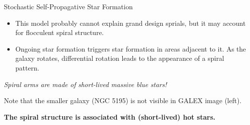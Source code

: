 \documentclass[letterpaper,landscape]{slides}
\begin{document}
\begin{slide}
\begin{center}
   {\large \color{red} Stochastic Self-Propagative Star Formation}
\end{center}

\begin{center}

\begin{itemize}
\vskip -0.3in
\item 
This model probably cannot explain grand design sprials, but it may account
for flocculent spiral structure. 
\vskip -0.3in
\item
Ongoing star formation triggers star formation in areas adjacent to it. As
the galaxy rotates, differential rotation leads to the appearance of a spiral pattern.
\end{itemize}


{\color{blue} {\it Spiral arms are made of short-lived massive blue stars!}}

\end{center}

\vfill
\end{slide}






\begin{slide}

\begin{center}
\vskip 1.2in

\end{center}

Note that the smaller galaxy (NGC 5195) is not visible in GALEX
image (left). 

{\bf \color{blue}  The spiral structure is associated with (short-lived) hot stars.}
 
\vfill
\end{slide}
\end{document}
